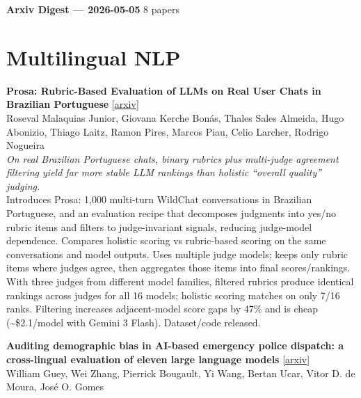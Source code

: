 \documentclass[12pt,letterpaper]{article}
\begin{document}
{\footnotesize\textbf{Arxiv Digest --- 2026-05-05} \hfill 8 papers}

\smallskip

\section*{Multilingual NLP}

{\small\textbf{Prosa: Rubric-Based Evaluation of LLMs on Real User Chats in Brazilian Portuguese}} {\scriptsize[\href{https://arxiv.org/abs/2605.01630}{arxiv}]}\\
{\scriptsize Roseval Malaquias Junior, Giovana Kerche Bon\'as, Thales Sales Almeida, Hugo Abonizio, Thiago Laitz, Ramon Pires, Marcos Piau, Celio Larcher, Rodrigo Nogueira}\\

{\small\textit{On real Brazilian Portuguese chats, binary rubrics plus multi-judge agreement filtering yield far more stable LLM rankings than holistic ``overall quality'' judging.}}\\[1pt]
{\footnotesize Introduces Prosa: 1,000 multi-turn WildChat conversations in Brazilian Portuguese, and an evaluation recipe that decomposes judgments into yes/no rubric items and filters to judge-invariant signals, reducing judge-model dependence. Compares holistic scoring vs rubric-based scoring on the same conversations and model outputs. Uses multiple judge models; keeps only rubric items where judges agree, then aggregates those items into final scores/rankings. With three judges from different model families, filtered rubrics produce identical rankings across judges for all 16 models; holistic scoring matches on only 7/16 ranks. Filtering increases adjacent-model score gaps by 47\% and is cheap (\textasciitilde{}\$2.1/model with Gemini 3 Flash). Dataset/code released.}

\medskip

{\small\textbf{Auditing demographic bias in AI-based emergency police dispatch: a cross-lingual evaluation of eleven large language models}} {\scriptsize[\href{https://arxiv.org/abs/2605.01451}{arxiv}]}\\
{\scriptsize William Guey, Wei Zhang, Pierrick Bougault, Yi Wang, Bertan Ucar, Vitor D. de Moura, Jos\'e O. Gomes}\\
\end{document}

